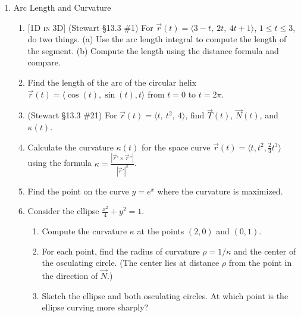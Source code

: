 \documentclass[12pt]{article}
\newcommand{\dimtag}[1]{{\footnotesize\textsc{[#1]}}\;}
\begin{document}
\begin{enumerate}
\begin{enumerate}
\begin{enumerate}
            \item Determine the position vector $\vec{r}(t)$ for all $t \geq 0$.
            \item Show that the electron is trapped on the surface of a sphere centered at the origin by finding the equation of that sphere.
        \end{enumerate}
        \item Find parametric equations of the tangent line to $\vec r(t)=\langle t,\ t^2,\ t^3\rangle$ at $t=1$.
        \item A projectile has acceleration $\langle 0,0,-g\rangle$, initial velocity $\langle v_0,0,0\rangle$, and starts at the origin. Find its position $\vec r(t)$.
    \end{enumerate}
\newpage

\item Arc Length and Curvature
    \begin{enumerate}
        \item \dimtag{1D in 3D} (Stewart \S13.3 \#1) For $\vec r(t) = \langle 3-t,\ 2t,\ 4t+1\rangle$, $1\leq t \leq 3$, do two things. (a) Use the arc length integral to compute the length of the segment. (b) Compute the length using the distance formula and compare.
        \item Find the length of the arc of the circular helix $\vec{r}(t) = \langle \cos(t), \sin(t), t \rangle$ from $t=0$ to $t=2\pi$.
        \item (Stewart \S13.3 \#21) For $\vec r(t) = \langle t,\ t^2,\ 4\rangle$, find $\vec T(t)$, $\vec N(t)$, and $\kappa(t)$.
        \item Calculate the curvature $\kappa(t)$ for the space curve $\vec{r}(t) = \langle t, t^2, \frac{2}{3}t^3 \rangle$ using the formula $\kappa = \frac{|\vec{r}' \times \vec{r}''|}{|\vec{r}'|^3}$.
        \item Find the point on the curve $y = e^x$ where the curvature is maximized.
        \item Consider the ellipse $\frac{x^2}{4} + y^2 = 1$.
        \begin{enumerate}
            \item Compute the curvature $\kappa$ at the points $(2, 0)$ and $(0, 1)$.
            \item For each point, find the radius of curvature $\rho = 1/\kappa$ and the center of the osculating circle. (The center lies at distance $\rho$ from the point in the direction of $\vec{N}$.)
            \item Sketch the ellipse and both osculating circles. At which point is the ellipse curving more sharply?

\end{enumerate}
\end{enumerate}
\end{enumerate}
\end{document}
